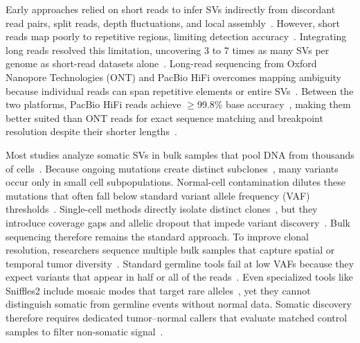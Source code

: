 Early approaches relied on short reads to infer SVs indirectly from discordant read pairs, split reads, depth fluctuations, and local assembly~\cite{manta,svaba,gripss}. 
However, short reads map poorly to repetitive regions, limiting detection accuracy~\cite{chaisson}. 
Integrating long reads resolved this limitation, uncovering 3 to 7 times as many SVs per genome as short-read datasets alone~\cite{chaisson}. 
Long-read sequencing from Oxford Nanopore Technologies (ONT) and PacBio HiFi overcomes mapping ambiguity because individual reads can span repetitive elements or entire SVs~\cite{sedlazeck,logsdon,Ahsan_2023}. 
Between the two platforms, PacBio HiFi reads achieve $\ge$99.8\% base accuracy~\cite{wenger}, making them better suited than ONT reads for exact sequence matching and breakpoint resolution despite their shorter lengths~\cite{logsdon,Delahaye_2021}.

Most studies analyze somatic SVs in bulk samples that pool DNA from thousands of cells~\cite{pcawg}. 
Because ongoing mutations create distinct subclones~\cite{ith}, many variants occur only in small cell subpopulations. 
Normal-cell contamination dilutes these mutations that often fall below standard variant allele frequency (VAF) thresholds~\cite{severus,nanomonsv}. 
Single-cell methods directly isolate distinct clones~\cite{navin}, but they introduce coverage gaps and allelic dropout that impede variant discovery~\cite{gawad}. 
Bulk sequencing therefore remains the standard approach. 
To improve clonal resolution, researchers sequence multiple bulk samples that capture spatial or temporal tumor diversity~\cite{mcgranahan,gerlinger}. 
Standard germline tools fail at low VAFs because they expect variants that appear in half or all of the reads~\cite{severus}. 
Even specialized tools like Sniffles2 include mosaic modes that target rare alleles~\cite{sniffles2}, yet they cannot distinguish somatic from germline events without normal data. 
Somatic discovery therefore requires dedicated tumor--normal callers that evaluate matched control samples to filter non-somatic signal~\cite{severus,savana,nanomonsv}.

